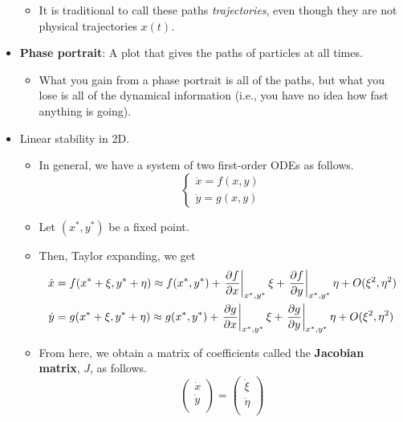 \documentclass[../notes.tex]{subfiles}
\begin{document}
\begin{itemize}
\begin{itemize}
        \item It is traditional to call these paths \emph{trajectories}, even though they are not physical trajectories $x(t)$.
    \end{itemize}
    \item \textbf{Phase portrait}: A plot that gives the paths of particles at all times.
    \begin{itemize}
        \item What you gain from a phase portrait is all of the paths, but what you lose is all of the dynamical information (i.e., you have no idea how fast anything is going).
    \end{itemize}
    \item Linear stability in 2D.
    \begin{itemize}
        \item In general, we have a system of two first-order ODEs as follows.
        \begin{equation*}
            \begin{cases}
                \dot{x} = f(x,y)\\
                \dot{y} = g(x,y)
            \end{cases}
        \end{equation*}
        \item Let $(x^*,y^*)$ be a fixed point.
        \item Then, Taylor expanding, we get
        \begin{align*}
            \dot{x} &= f(x^*+\xi,y^*+\eta) \approx f(x^*,y^*)+\eval{\pdv{f}{x}}_{x^*,y^*}\xi+\eval{\pdv{f}{y}}_{x^*,y^*}\eta+O(\xi^2,\eta^2)\\
            \dot{y} &= g(x^*+\xi,y^*+\eta) \approx g(x^*,y^*)+\eval{\pdv{g}{x}}_{x^*,y^*}\xi+\eval{\pdv{g}{y}}_{x^*,y^*}\eta+O(\xi^2,\eta^2)
        \end{align*}
        \item From here, we obtain a matrix of coefficients called the \textbf{Jacobian matrix}, $J$, as follows.
        \begin{equation*}
            \begin{pmatrix}
                \dot{x}\\
                \dot{y}\\
            \end{pmatrix}
            =
            \begin{pmatrix}
                \dot{\xi}\\
                \dot{\eta}\\

\end{pmatrix}
\end{equation*}
\end{itemize}
\end{itemize}
\end{document}
